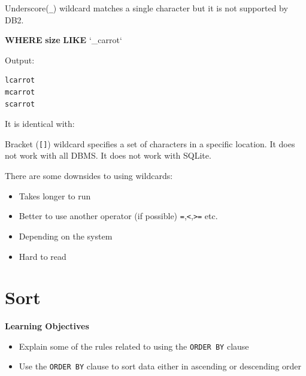 \documentclass[]{book}
\newenvironment{Shaded}{\begin{snugshade}}{\end{snugshade}}
\newcommand{\KeywordTok}[1]{\textcolor[rgb]{0.13,0.29,0.53}{\textbf{{#1}}}}
\newcommand{\NormalTok}[1]{{#1}}
\providecommand{\tightlist}{%
  \setlength{\itemsep}{0pt}\setlength{\parskip}{0pt}}
\theoremstyle{definition}
\theoremstyle{definition}
\theoremstyle{remark}
\begin{document}
Underscore(\texttt{\_}) wildcard matches a single character but it is
not supported by DB2.

\begin{Shaded}
\begin{Highlighting}[]
\KeywordTok{WHERE} \KeywordTok{size} \KeywordTok{LIKE} \NormalTok{`_carrot`}
\end{Highlighting}
\end{Shaded}

Output:

\begin{verbatim}
lcarrot
mcarrot
scarrot
\end{verbatim}

It is identical with:

\begin{Shaded}
\end{Shaded}

Bracket (\texttt{{[}{]}}) wildcard specifies a set of characters in a
specific location. It does not work with all DBMS. It does not work with
SQLite.

There are some downsides to using wildcards:

\begin{itemize}
\tightlist
\item
  Takes longer to run
\item
  Better to use another operator (if possible)
  \texttt{=},\texttt{\textless{}},\texttt{\textgreater{}=} etc.
\item
  Depending on the system
\item
  Hard to read
\end{itemize}

\section{Sort}\label{sort}

\textbf{Learning Objectives}

\begin{itemize}
\tightlist
\item
  Explain some of the rules related to using the \texttt{ORDER\ BY}
  clause
\item
  Use the \texttt{ORDER\ BY} clause to sort data either in ascending or
  descending order
\end{itemize}
\end{document}

